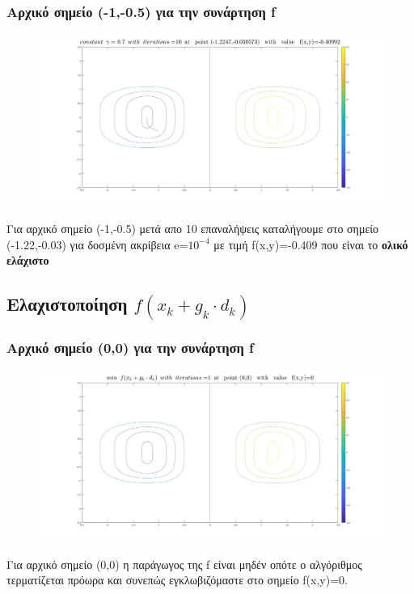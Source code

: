 \documentclass{article}
\begin{document}
\subsubsection*{Αρχικό σημείο (-1,-0.5) για την συνάρτηση f}
\begin{figure}[h!]	
     \centering  
     \advance\leftskip-0.2cm  
  \includegraphics[width=140mm,scale=2]{n1a.jpg}
\end{figure} 
Για αρχικό σημείο (-1,-0.5) μετά απο 10 επαναλήψεις καταλήγουμε στο σημείο (-1.22,-0.03) για  δοσμένη ακρίβεια e=$10^{-4}$ με τιμή f(x,y)=-0.409 που είναι  το \textbf{ολικό ελάχιστο}
\clearpage
\subsection*{Ελαχιστοποίηση $f(x_k+g_k \cdot d_k )$}
 
\subsubsection*{Αρχικό σημείο (0,0) για την συνάρτηση f}
\begin{figure}[h!]	
     \centering  
     \advance\leftskip-0.2cm  
  \includegraphics[width=140mm,scale=2]{mfa.jpg}
\end{figure} 
Για αρχικό σημείο (0,0) η παράγωγος της f είναι μηδέν οπότε ο αλγόριθμος τερματίζεται πρόωρα και συνεπώς εγκλωβιζόμαστε στο σημείο f(x,y)=0.
\end{document}

